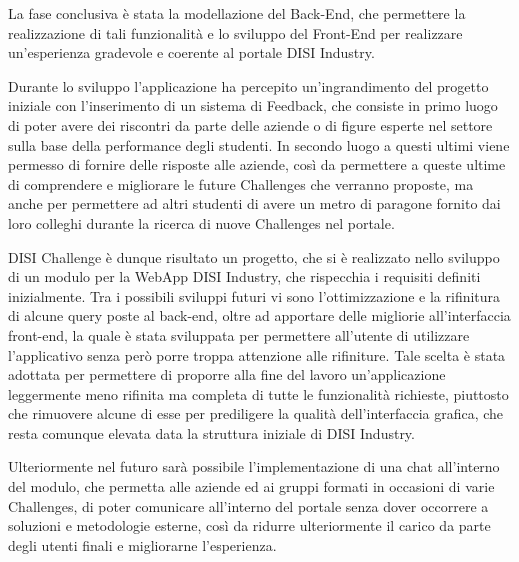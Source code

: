 La fase conclusiva è stata la modellazione del Back-End, che permettere la realizzazione di tali funzionalità e lo sviluppo del Front-End per realizzare un'esperienza gradevole e coerente al portale DISI Industry.

Durante lo sviluppo l'applicazione ha percepito un'ingrandimento del progetto iniziale con l'inserimento di un sistema di Feedback, che consiste in primo luogo di poter avere dei riscontri da parte delle aziende o di figure esperte nel settore sulla base della performance degli studenti. In secondo luogo a questi ultimi viene permesso di fornire delle risposte alle aziende, così da permettere a queste ultime di comprendere e migliorare le future Challenges che verranno proposte, ma anche per permettere ad altri studenti di avere un metro di paragone fornito dai loro colleghi durante la ricerca di nuove Challenges nel portale.

DISI Challenge è dunque risultato un progetto, che si è realizzato nello sviluppo di un modulo per la WebApp DISI Industry, che rispecchia i requisiti definiti inizialmente. Tra i possibili sviluppi futuri vi sono l'ottimizzazione e la rifinitura di alcune query poste al back-end, oltre ad apportare delle migliorie all'interfaccia front-end, la quale è stata sviluppata per permettere all'utente di utilizzare l'applicativo senza però porre troppa attenzione alle rifiniture. Tale scelta è stata adottata per permettere di proporre alla fine del lavoro un'applicazione leggermente meno rifinita ma completa di tutte le funzionalità richieste, piuttosto che rimuovere alcune di esse per prediligere la qualità dell'interfaccia grafica, che resta comunque elevata data la struttura iniziale di DISI Industry.

Ulteriormente nel futuro sarà possibile l'implementazione di una chat all'interno del modulo, che permetta alle aziende ed ai gruppi formati in occasioni di varie Challenges, di poter comunicare all'interno del portale senza dover occorrere a soluzioni e metodologie esterne, così da ridurre ulteriormente il carico da parte degli utenti finali e migliorarne l'esperienza.
